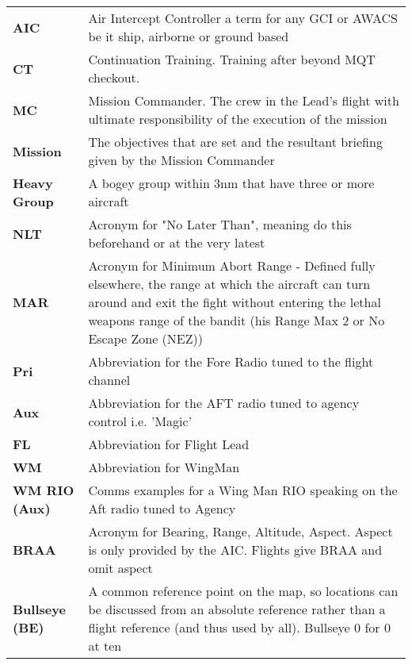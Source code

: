 \renewcommand\arraystretch{1.5}\begin{tabularx}{\textwidth}{lX}

  \textbf{AIC} & Air Intercept Controller a term for any GCI or AWACS be it
  ship, airborne or ground based
  \\
  \textbf{CT} & Continuation Training. Training after beyond MQT checkout.
  \\
  \textbf{MC} & Mission Commander. The crew in the Lead's flight with ultimate
  responsibility of the execution of the mission
  \\
  \textbf{Mission} & The objectives that are set and the resultant briefing
  given by the Mission Commander
  \\
  \textbf{Heavy Group} & A bogey group within 3nm that have three or more
  aircraft
  \\
  \textbf{NLT} & Acronym for "No Later Than", meaning do this beforehand or at
  the very latest
  \\
  \textbf{MAR} & Acronym for Minimum Abort Range - Defined fully elsewhere, the
  range at which the aircraft can turn around and exit the fight without
  entering the lethal weapons range of the bandit (his Range Max 2 or No Escape
  Zone (NEZ))
  \\
  \textbf{Pri} & Abbreviation for the Fore Radio tuned to the flight channel
  \\
  \textbf{Aux} & Abbreviation for the AFT radio tuned to agency control i.e.
  'Magic'
  \\
  \textbf{FL} & Abbreviation for Flight Lead
  \\
  \textbf{WM} & Abbreviation for WingMan
  \\
  \textbf{WM RIO (Aux)} & Comms examples for a Wing Man RIO speaking on the Aft
  radio tuned to Agency
  \\
  \textbf{BRAA} & Acronym for Bearing, Range, Altitude, Aspect. Aspect is only
  provided by the AIC. Flights give BRAA and omit aspect
  \\
  \textbf{Bullseye (BE)} & A common reference point on the map, so locations
  can be discussed from an absolute reference rather than a flight reference
  (and thus used by all). Bullseye 0 for 0 at ten
\end{tabularx}


\newpage

